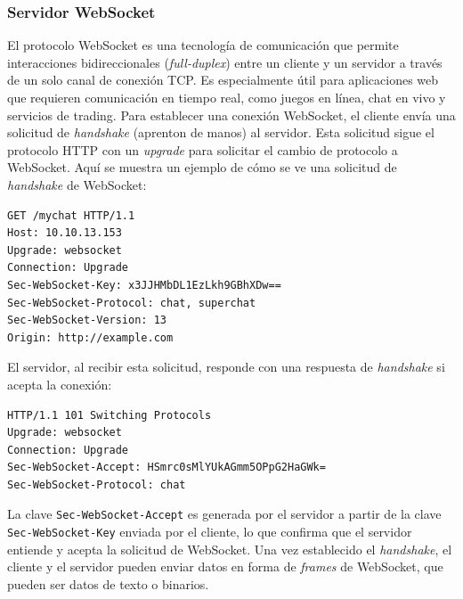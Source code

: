 \subsubsection{Servidor WebSocket}\label{sec:serverWebSocket}
 
El protocolo WebSocket es una tecnología de comunicación que permite interacciones bidireccionales (\textit{full-duplex}) entre un cliente y un servidor a través de un solo canal de conexión TCP. Es especialmente útil para aplicaciones web que requieren comunicación en tiempo real, como juegos en línea, chat en vivo y servicios de trading. Para establecer una conexión WebSocket, el cliente envía una solicitud de  \textit{handshake} (aprenton de manos) al servidor. Esta solicitud sigue el protocolo HTTP con un \textit{upgrade} para solicitar el cambio de protocolo a WebSocket. Aquí se muestra un ejemplo de cómo se ve una solicitud de \textit{handshake} de WebSocket:

\begin{verbatim}
GET /mychat HTTP/1.1
Host: 10.10.13.153
Upgrade: websocket
Connection: Upgrade
Sec-WebSocket-Key: x3JJHMbDL1EzLkh9GBhXDw==
Sec-WebSocket-Protocol: chat, superchat
Sec-WebSocket-Version: 13
Origin: http://example.com
\end{verbatim}

El servidor, al recibir esta solicitud, responde con una respuesta de \textit{handshake} si acepta la conexión:

\begin{verbatim}
HTTP/1.1 101 Switching Protocols
Upgrade: websocket
Connection: Upgrade
Sec-WebSocket-Accept: HSmrc0sMlYUkAGmm5OPpG2HaGWk=
Sec-WebSocket-Protocol: chat
\end{verbatim}

La clave \texttt{Sec-WebSocket-Accept} es generada por el servidor a partir de la clave \texttt{Sec-WebSocket-Key} enviada por el cliente, lo que confirma que el servidor entiende y acepta la solicitud de WebSocket. Una vez establecido el \textit{handshake}, el cliente y el servidor pueden enviar datos en forma de \textit{frames} de WebSocket, que pueden ser datos de texto o binarios.



